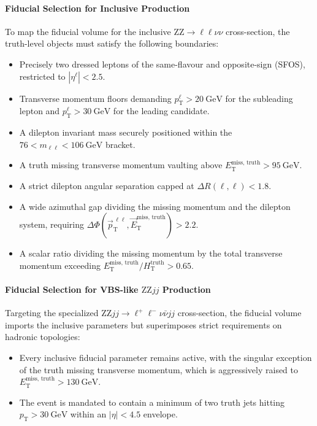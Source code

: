 \paragraph{\textbf{Fiducial Selection for Inclusive Production}}
To map the fiducial volume for the inclusive $\text{ZZ} \to \ell\ell\nu\nu$ cross-section, the truth-level objects must satisfy the following boundaries:
\begin{itemize}
    \item Precisely two dressed leptons of the same-flavour and opposite-sign (SFOS), restricted to $|\eta^\ell| < 2.5$.
    \item Transverse momentum floors demanding $p_{\text{T}}^\ell > 20~\text{GeV}$ for the subleading lepton and $p_{\text{T}}^\ell > 30~\text{GeV}$ for the leading candidate.
    \item A dilepton invariant mass securely positioned within the $76 < m_{\ell\ell} < 106~\text{GeV}$ bracket.
    \item A truth missing transverse momentum vaulting above $E_{\text{T}}^{\text{miss, truth}} > 95~\text{GeV}$.
    \item A strict dilepton angular separation capped at $\Delta R(\ell,\ell) < 1.8$.
    \item A wide azimuthal gap dividing the missing momentum and the dilepton system, requiring $\Delta\Phi(\vec{p}_{\text{T}}^{\,\ell\ell}, \vec{E}_{\text{T}}^{\text{miss, truth}}) > 2.2$.
    \item A scalar ratio dividing the missing momentum by the total transverse momentum exceeding $E_{\text{T}}^{\text{miss, truth}} / H_{\text{T}}^{\text{truth}} > 0.65$.
\end{itemize}

\paragraph{\textbf{Fiducial Selection for VBS-like $\text{ZZ}jj$ Production}}
Targeting the specialized $\text{ZZ}jj \to \ell^+\ell^-\nu\bar{\nu} jj$ cross-section, the fiducial volume imports the inclusive parameters but superimposes strict requirements on hadronic topologies:
\begin{itemize}
    \item Every inclusive fiducial parameter remains active, with the singular exception of the truth missing transverse momentum, which is aggressively raised to $E_{\text{T}}^{\text{miss, truth}} > 130~\text{GeV}$.
    \item The event is mandated to contain a minimum of two truth jets hitting $p_{\text{T}} > 30~\text{GeV}$ within an $|\eta| < 4.5$ envelope.
\end{itemize}


